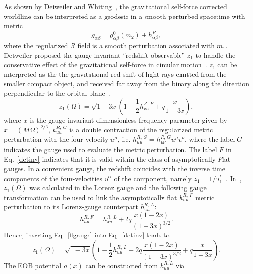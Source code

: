 As shown by Detweiler and Whiting~\cite{Detweiler:2003}, the gravitational self-force corrected worldline can be interpreted as a  geodesic in a smooth perturbed spacetime with metric
 \begin{equation}
 g_{\alpha \beta} =  g^{0}_{\alpha \beta}(m_2) + h^{R}_{\alpha \beta},
 \label{detint}
 \end{equation}
where the regularized \(R\) field is a smooth perturbation 
associated with \(m_1\). Detweiler proposed the gauge invariant 
``redshift observable'' \(z_1\) to handle the conservative effect of the gravitational
self-force in circular motion~\cite{Detweiler:2008,Detweiler:2009}.
\(z_1\) can be interpreted as the the gravitational red-shift of 
light rays emitted from the smaller compact object, and received far
away from the binary along the direction perpendicular to the
orbital plane~\cite{Detweiler:2008}.
 \begin{equation}
z_1(\Omega)= \sqrt{1-3x}\left(1- \frac{1}{2} h^{R,\,F}_{uu} + q \frac{x}{1-3x}\right),
\label{detinv}
\end{equation}
\noindent where  \(x\) is the gauge-invariant dimensionless frequency parameter 
given by \(x=\left(M \Omega\right)^{2/3}\), \(h^{R,\,G}_{uu}\) is a double
contraction of the regularized metric perturbation with the four-velocity
\(u^{\mu}\), i.e. \( h^{R,\, G}_{uu} = h^{R,\,G}_{\mu\nu}u^{\mu} u^{\nu} \), 
where the label \(G\) indicates the gauge used to evaluate the metric perturbation.
The label \(F\) in Eq.~\ref{detinv} indicates that it is valid within the class 
of asymptotically {\it F}lat gauges.
In a convenient gauge, the redshift coincides with the 
inverse time components of the four-velocities \(u^\alpha\) of the
component, namely \(z_1 = 1/u^t_1\)~\cite{Detweiler:2008}.
In~\cite{Akcay:2012}, \(z_1(\Omega)\) was calculated in the Lorenz gauge and the 
following gauge transformation can be used to link the asymptotically flat 
\(h^{R,\,F}_{uu} \) metric perturbation to its Lorenz-gauge counterpart 
\(h^{R,\,L}_{uu} \):
\begin{equation}
h^{R,\,F}_{uu} = h^{R,\,L}_{uu} + 2q\frac{x(1-2x)}{\left(1-3x\right)^{3/2}}.
\label{flgauge}
\end{equation}
Hence, inserting Eq.~\eqref{flgauge} into Eq.~\eqref{detinv} leads to
 \begin{equation}
z_1(\Omega)= \sqrt{1-3x}\left(1- \frac{1}{2} h^{R,\,L}_{uu}  - 2q\frac{x(1-2x)}{\left(1-3x\right)^{3/2}} + q \frac{x}{1-3x}\right).
\label{detinvLOR}
\end{equation}
The EOB potential \(a(x)\) can be constructed from $h_{uu}^{R,L}$ via
